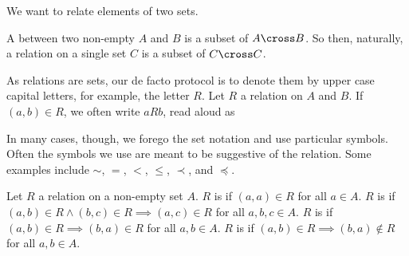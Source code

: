 
\sbasic




\sstart


We want to relate elements of two sets.



A  between two non-empty  $A$ and $B$ is a subset of $A \cross B$.
So then, naturally, a relation on a single set $C$ is a subset of $C \cross C$.

As relations are sets, our de facto protocol is to denote them by upper case capital letters, for example, the letter $R$.
Let $R$ a relation on $A$ and $B$.
If $(a, b) \in R$, we often write $a R b$, read aloud as 

In many cases, though, we forego the set notation and use particular symbols.
Often the symbols we use are meant to be suggestive of the relation.
Some examples include $\sim$, $=$, $<$, $\leq$, $\prec$, and $\preceq$.


Let $R$ a relation on a non-empty set $A$.
$R$ is  if $(a, a) \in R$ for all $a \in A$.
$R$ is  if $(a, b) \in R \land (b, c) \in R \implies (a, c) \in R$ for all $a, b, c \in A$.
$R$ is  if $(a, b) \in R \implies (b, a) \in R$ for all $a, b \in A$.
$R$ is  if $(a, b) \in R \implies (b, a) \not\in R$ for all $a, b \in A$.

\strats

